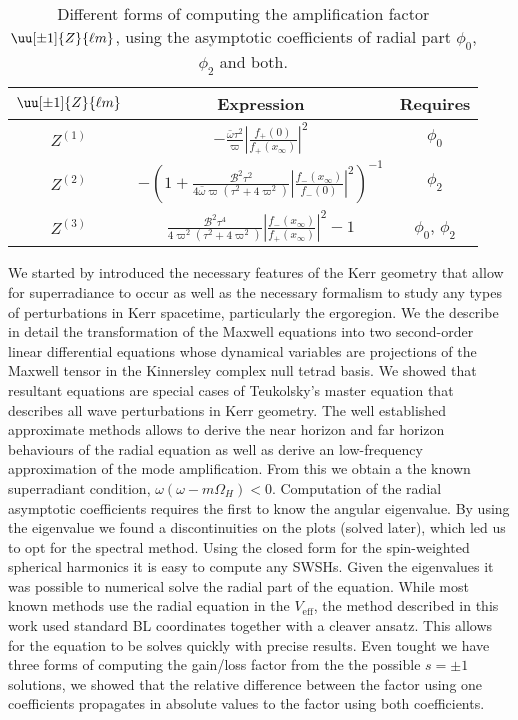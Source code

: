 \begin{table}[h]
	\centering
	\tabulinesep=1.5mm
    \begin{tabu}{@{\hskip 0.25cm}c@{\hskip 0.75cm}c@{\hskip 0.75cm}c@{\hskip 0.25cm}}
        \hline
        $\uu[\pm 1]{Z}{\ell m}$ & Expression & Requires \\
		\hline\hline
		$Z^{(1)}$
		& $-\frac{\bar{\omega} \tau^2}{\varpi} \left|\frac{f_{+}(0)}{f_{+}(x_\infty)}\right|^2$
		& $\phi_0$  \\
		\hline
		$Z^{(2)}$
		& $-\left( 1 + \frac{\mathscr{B}^2 \tau^2}{4 \bar{\omega} \varpi(\tau^2 + 4 \varpi^2)} \left|\frac{f_{-}(x_\infty)}{f_{-}(0)}\right|^2 \right)^{-1}$
		& $\phi_2$ \\
		\hline
		$Z^{(3)}$
		& $\frac{\mathscr{B}^2 \tau^4 }{4 \varpi^2 (\tau^2 + 4 \varpi^2)} \left| \frac{f_{-}(x_\infty)}{f_{+}(x_\infty)} \right|^2 - 1$
		& $\phi_0$, $\phi_2$ \\
        \hline
    \end{tabu}
    \caption{Different forms of computing the amplification factor $\uu[\pm 1]{Z}{\ell m}$, using the asymptotic coefficients of radial part $\phi_0$, $\phi_2$ and both.}
    \label{tb4:diferentsZs}
\end{table}

We started by introduced the necessary features of the Kerr geometry that allow for superradiance to occur as well as the necessary formalism to study any types of perturbations in Kerr spacetime, particularly the ergoregion.
We the describe in detail the transformation of the Maxwell equations into two second-order linear differential equations whose dynamical variables are projections of the Maxwell tensor in the Kinnersley complex null tetrad basis.
We showed that resultant equations are special cases of Teukolsky's master equation that describes all wave perturbations in Kerr geometry.
The well established approximate methods allows to derive the near horizon and far horizon behaviours of the radial equation as well as derive an low-frequency approximation of the mode amplification.
From this we obtain a the known superradiant condition, $\omega(\omega - m \Omega_H)<0$.
Computation of the radial asymptotic coefficients requires the first to know the angular eigenvalue.
By using the eigenvalue we found a discontinuities on the plots (solved later), which led us to opt for the spectral method. Using the closed form for the spin-weighted spherical harmonics it is easy to compute any SWSHs.
Given the eigenvalues it was possible to numerical solve the radial part of the equation.
While most known methods use the radial equation in the $V_\mathrm{eff}$, the method described in this work used standard BL coordinates together with a cleaver ansatz.
This allows for the equation to be solves quickly with precise results.
Even tought we have three forms of computing the gain/loss factor from the the possible $s=\pm 1$ solutions, we showed that the relative difference between the factor using one coefficients propagates in absolute values to the factor using both coefficients.